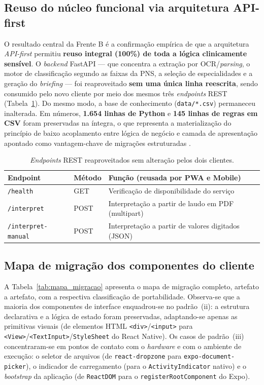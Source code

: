 \subsection{Reuso do núcleo funcional via arquitetura API-first}

O resultado central da Frente B é a confirmação empírica de que a arquitetura
\emph{API-first} permitiu \textbf{reuso integral (100\%) de toda a lógica
clinicamente sensível}. O \emph{backend} FastAPI --- que concentra a extração
por OCR/\emph{parsing}, o motor de classificação segundo as faixas da PNS, a
seleção de especialidades e a geração do \emph{briefing} --- foi reaproveitado
\textbf{sem uma única linha reescrita}, sendo consumido pelo novo cliente por
meio dos mesmos três \emph{endpoints} REST (Tabela~\ref{tab:endpoints}). Do
mesmo modo, a base de conhecimento (\texttt{data/*.csv}) permaneceu inalterada.
Em números, \textbf{1.654 linhas de Python} e \textbf{145 linhas de regras em
CSV} foram preservadas na íntegra, o que representa a materialização do
princípio de baixo acoplamento entre lógica de negócio e camada de apresentação
apontado como vantagem-chave de migrações estruturadas \cite{rampinelli2026}.

\begin{table}[H]
\centering
\caption{\emph{Endpoints} REST reaproveitados sem alteração pelos dois clientes.}
\label{tab:endpoints}
\footnotesize
\begin{tabular}{|l|l|p{6.2cm}|}
\hline
\textbf{Endpoint} & \textbf{Método} & \textbf{Função (reusada por PWA e Mobile)} \\ \hline
\texttt{/health} & GET & Verificação de disponibilidade do serviço \\ \hline
\texttt{/interpret} & POST & Interpretação a partir de laudo em PDF (multipart) \\ \hline
\texttt{/interpret-manual} & POST & Interpretação a partir de valores digitados (JSON) \\ \hline
\end{tabular}
\end{table}

\subsection{Mapa de migração dos componentes do cliente}

A Tabela~\ref{tab:mapa_migracao} apresenta o mapa de migração completo, artefato
a artefato, com a respectiva classificação de portabilidade. Observa-se que a
maioria dos componentes de interface enquadrou-se no padrão~(ii): a estrutura
declarativa e a lógica de estado foram preservadas, adaptando-se apenas as
primitivas visuais (de elementos HTML \texttt{<div>}/\texttt{<input>} para
\texttt{<View>}/\texttt{<TextInput>}/\texttt{StyleSheet} do React Native). Os
casos de padrão~(iii) concentraram-se em pontos de contato com o \emph{hardware}
e com o ambiente de execução: o seletor de arquivos (de \texttt{react-dropzone}
para \texttt{expo-document-picker}), o indicador de carregamento (para o
\texttt{ActivityIndicator} nativo) e o \emph{bootstrap} da aplicação (de
\texttt{ReactDOM} para o \texttt{registerRootComponent} do Expo).

